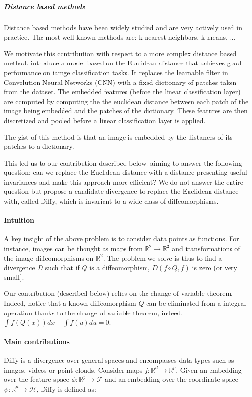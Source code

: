 \subparagraph{Distance based methods}
Distance based methods have been widely studied and are very actively used in practice. The most well known methods are: k-nearest-neighbors, k-means, ...

We motivate this contribution with respect to a more complex distance based method. \cite{thiry} introduce a model based on the Euclidean distance that achieves good performance on iamge classification tasks. It replaces the learnable filter in Convolution Neural Networks (CNN) with a fixed dictionary of patches taken from the dataset. The embedded features (before the linear classification layer) are computed by computing the the euclidean distance between each patch of the image being embedded and the patches of the dictionary. These features are then discretized and pooled before a linear classification layer is applied.

The gist of this method is that an image is embedded by the distances of its patches to a dictionary.

This led us to our contribution described below, aiming to answer the following question: can we replace the Euclidean distance with a distance presenting useful invariances and make this approach more efficient? We do not answer the entire question but propose a candidate divergence to replace the Euclidean distance with, called Diffy, which is invariant to a wide class of diffeomorphisms.

\paragraph{Intuition}
A key insight of the above problem is to consider data points as functions. For instance, images can be thought as maps from $\mathbb R^2 \to \mathbb R^3$ and transformations of the image diffeomorphisms on $\mathbb R^2$. The problem we solve is thus to find a divergence $D$ such that if $Q$ is a diffeomorphism, $D(f\circ Q, f)$ is zero (or very small).

Our contribution (described below) relies on the change of variable theorem. Indeed, notice that a known diffeomorphism $Q$ can be eliminated from a integral operation thanks to the change of variable theorem, indeed: $\int f(Q(x))dx - \int f(u)du = 0$.

\paragraph{Main contributions}
Diffy is a divergence over general spaces and encompasses data types such as images, videos or point clouds. Consider maps $f:\mathbb R^d \to \mathbb R^p$. Given an embedding over the feature space $\phi: \mathbb R^p \to\mathcal F$ and an embedding over the coordinate space $\psi: \mathbb R^d \to \mathcal H$, Diffy is defined as:

